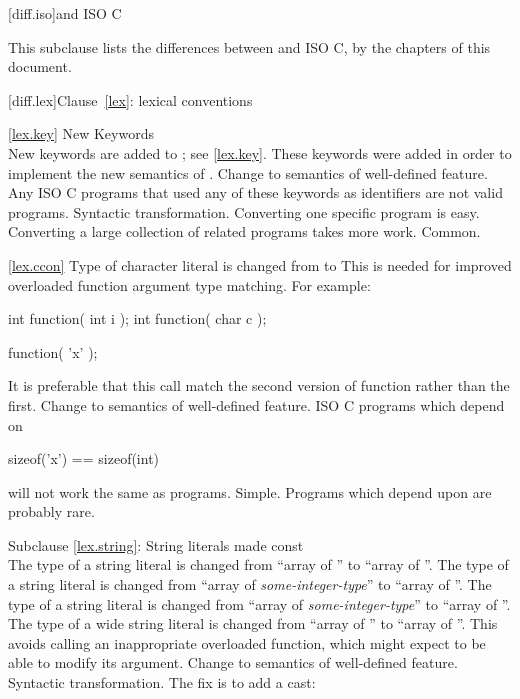 
[diff.iso]{\Cpp and ISO C}

\pnum
{}%
This subclause lists the differences between \Cpp and
ISO C, by the chapters of this document.

[diff.lex]{Clause~\ref{lex}: lexical conventions}

\ref{lex.key}
\change New Keywords\\
New keywords are added to \Cpp;
see \ref{lex.key}.
\rationale
These keywords were added in order to implement the new
semantics of \Cpp.
\effect
Change to semantics of well-defined feature.
Any ISO C programs that used any of these keywords as identifiers
are not valid \Cpp programs.
\difficulty
Syntactic transformation.
Converting one specific program is easy.
Converting a large collection
of related programs takes more work.
\howwide
Common.

\ref{lex.ccon}
\change Type of character literal is changed from  to 
\rationale
This is needed for improved overloaded function argument type
matching.
For example:

\begin{codeblock}
int function( int i );
int function( char c );

function( 'x' );
\end{codeblock}

It is preferable that this call match the second version of
function rather than the first.
\effect
Change to semantics of well-defined feature.
ISO C programs which depend on

\begin{codeblock}
sizeof('x') == sizeof(int)
\end{codeblock}

will not work the same as \Cpp programs.
\difficulty
Simple.
\howwide
Programs which depend upon  are probably rare.

Subclause \ref{lex.string}:
\change String literals made const\\
The type of a string literal is changed
from ``array of ''
to ``array of ''.
The type of a  string literal is changed
from ``array of \textit{some-integer-type}''
to ``array of ''.
The type of a  string literal is changed
from ``array of \textit{some-integer-type}''
to ``array of ''.
The type of a wide string literal is changed
from ``array of ''
to ``array of ''.
\rationale
This avoids calling an inappropriate overloaded function,
which might expect to be able to modify its argument.
\effect
Change to semantics of well-defined feature.
\difficulty
Syntactic transformation. The fix is to add a cast:

